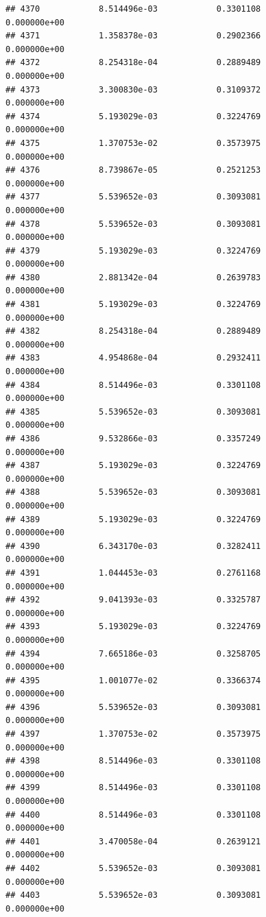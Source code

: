 \documentclass[
]{article}
\begin{document}
\begin{verbatim}
## 4370            8.514496e-03            0.3301108            0.000000e+00
## 4371            1.358378e-03            0.2902366            0.000000e+00
## 4372            8.254318e-04            0.2889489            0.000000e+00
## 4373            3.300830e-03            0.3109372            0.000000e+00
## 4374            5.193029e-03            0.3224769            0.000000e+00
## 4375            1.370753e-02            0.3573975            0.000000e+00
## 4376            8.739867e-05            0.2521253            0.000000e+00
## 4377            5.539652e-03            0.3093081            0.000000e+00
## 4378            5.539652e-03            0.3093081            0.000000e+00
## 4379            5.193029e-03            0.3224769            0.000000e+00
## 4380            2.881342e-04            0.2639783            0.000000e+00
## 4381            5.193029e-03            0.3224769            0.000000e+00
## 4382            8.254318e-04            0.2889489            0.000000e+00
## 4383            4.954868e-04            0.2932411            0.000000e+00
## 4384            8.514496e-03            0.3301108            0.000000e+00
## 4385            5.539652e-03            0.3093081            0.000000e+00
## 4386            9.532866e-03            0.3357249            0.000000e+00
## 4387            5.193029e-03            0.3224769            0.000000e+00
## 4388            5.539652e-03            0.3093081            0.000000e+00
## 4389            5.193029e-03            0.3224769            0.000000e+00
## 4390            6.343170e-03            0.3282411            0.000000e+00
## 4391            1.044453e-03            0.2761168            0.000000e+00
## 4392            9.041393e-03            0.3325787            0.000000e+00
## 4393            5.193029e-03            0.3224769            0.000000e+00
## 4394            7.665186e-03            0.3258705            0.000000e+00
## 4395            1.001077e-02            0.3366374            0.000000e+00
## 4396            5.539652e-03            0.3093081            0.000000e+00
## 4397            1.370753e-02            0.3573975            0.000000e+00
## 4398            8.514496e-03            0.3301108            0.000000e+00
## 4399            8.514496e-03            0.3301108            0.000000e+00
## 4400            8.514496e-03            0.3301108            0.000000e+00
## 4401            3.470058e-04            0.2639121            0.000000e+00
## 4402            5.539652e-03            0.3093081            0.000000e+00
## 4403            5.539652e-03            0.3093081            0.000000e+00

\end{verbatim}
\end{document}
